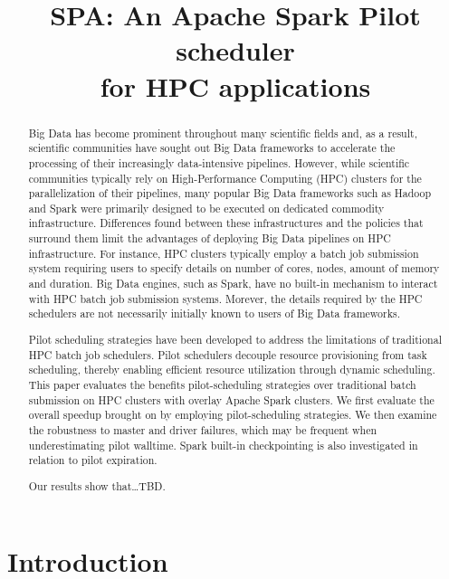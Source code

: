 \documentclass{IEEEtran}
\begin{document}
\title{SPA: An Apache Spark Pilot scheduler\\ for HPC applications}
\author{
    \IEEEauthorblockA{}
}
\maketitle

\begin{abstract}
    Big Data has become prominent throughout many scientific fields and, as a
    result, scientific communities have sought out Big Data frameworks to 
    accelerate the processing of their increasingly data-intensive pipelines.
    However, while scientific communities typically rely on High-Performance 
    Computing (HPC) clusters for the parallelization of their pipelines, many 
    popular Big Data frameworks such as Hadoop and Spark were primarily designed
    to be executed on dedicated commodity infrastructure. Differences found between
    these infrastructures and the policies that surround them limit the advantages
    of deploying Big Data pipelines on HPC infrastructure. For instance, HPC
    clusters typically employ a batch job submission system requiring users to
    specify details on number of cores, nodes, amount of memory and duration.
    Big Data engines, such as Spark, have no built-in mechanism to interact with
    HPC batch job submission systems. Morever, the details required by the HPC
    schedulers are not necessarily initially known to users of Big Data frameworks.

    Pilot scheduling strategies have been developed to address the limitations 
    of traditional HPC batch job schedulers. Pilot schedulers decouple resource
    provisioning from task scheduling, thereby enabling efficient resource
    utilization through dynamic scheduling. This paper evaluates the benefits 
    pilot-scheduling strategies over traditional batch submission
    on HPC clusters with overlay Apache Spark clusters. We first evaluate the
    overall speedup brought on by employing pilot-scheduling strategies. We then
    examine the robustness to master and driver failures, which may be frequent 
    when underestimating pilot walltime. Spark built-in checkpointing is also 
    investigated in relation to pilot expiration.

    Our results show that\ldots TBD.
\end{abstract}

\section{Introduction}
\end{document}
